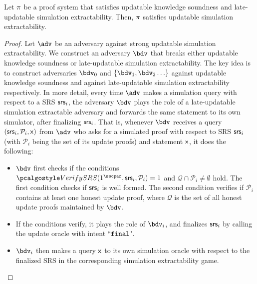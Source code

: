 \begin{lemma}
	Let $\pi$ be a proof system that satisfies updatable knowledge soundness and late-updatable simulation extractability. Then, $\pi$
	satisfies updatable simulation extractability.
\end{lemma}
\begin{proof}
	Let $\advse$ be an adversary against strong updatable simulation extractability. We construct an adversary $\bdv$ that breaks either updatable knowledge soundness or late-updatable simulation extractability.
	The key idea is to construct adversaries $\bdv_0$ and $\{\bdv_1, \bdv_2\ldots \}$ against updatable knowledge soundness and against late-updatable simulation extractability respectively. 
	In more detail, every time $\advse$ makes a simulation query with respect to a SRS $\mathsf{srs}_i$, the adversary $\bdv$ plays the role of a late-updatable simulation extractable adversary and forwards the same  
	statement to its own simulator, after finalizing $\mathsf{srs}_i$. 
	That is, whenever $\bdv$ receives a query $(\mathsf{srs}_i, \mathcal{P}_i, \mathsf{x})$ from $\advse$ who asks for a simulated proof with respect to SRS $\mathsf{srs}_i$ (with $\mathcal{P}_i$ being the set of its update proofs) and statement $\mathsf{x}$, it does the following: 
	
	\begin{itemize}
		\item 
		$\bdv$ first checks if the conditions
		$\verifyCRS(1^\secpar,\srs_i, \mathcal{P}_i) = 1$ and $\mathcal{Q} \cap \mathcal{P}_i \neq \emptyset$ hold. The first condition checks if $\mathsf{srs}_i$ is well formed. The second condition verifies if $\mathcal{P}_i$ contains at least
		one honest update proof, where $\mathcal{Q}$ is the set of all honest update proofs maintained by $\bdv$. 
		\item If the conditions verify, it plays the role of $\bdv_i$, and finalizes $\mathsf{srs}_i$ by calling the update oracle with intent ``$\mathtt{final}$". 
		
		\item
		$\bdv_i$ then makes a query $\mathsf{x}$ to its own simulation oracle with respect to the finalized SRS in the corresponding simulation extractability game.
		

\end{itemize}
\end{proof}
